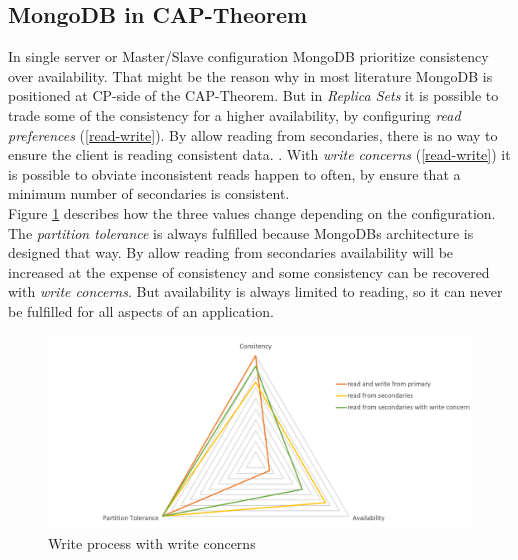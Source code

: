 \subsection{MongoDB in CAP-Theorem}
In single server or Master/Slave configuration MongoDB prioritize consistency over availability. That might be the reason why in most literature MongoDB is positioned at CP-side of the CAP-Theorem. But in \textit{Replica Sets} it is possible to trade some of the consistency for a higher availability, by configuring \textit{read preferences} (\ref{read-write}). By allow reading from secondaries, there is no way to ensure the client is reading consistent data. . With \textit{write concerns} (\ref{read-write}) it is possible to obviate inconsistent reads happen to often, by ensure that a minimum number of secondaries is consistent. \\
Figure \ref{mongodb-cap} describes how the three values change depending on the configuration. The \textit{partition tolerance} is always fulfilled because MongoDBs architecture is designed that way. By allow reading from secondaries availability will be increased at the expense of consistency and some consistency can be recovered with \textit{write concerns}. But availability is always limited to reading, so it can never be fulfilled for all aspects of an application.
\begin{figure}[H]
\includegraphics[width=\linewidth,keepaspectratio]{images/mongodb-cap.png}
\caption{Write process with write concerns}
\label{mongodb-cap}
\end{figure}